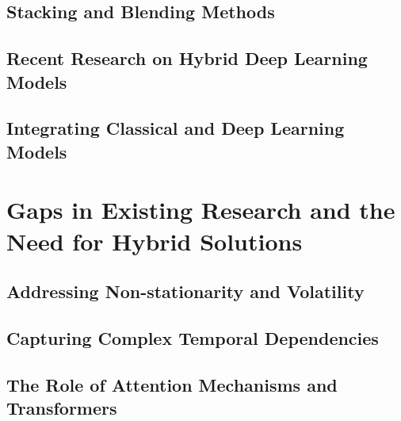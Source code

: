 \subsection{Stacking and Blending Methods} %

\subsection{Recent Research on Hybrid Deep Learning Models} %

\subsection{Integrating Classical and Deep Learning Models} %

\section{Gaps in Existing Research and the Need for Hybrid Solutions} %
\subsection{Addressing Non-stationarity and Volatility} %

\subsection{Capturing Complex Temporal Dependencies} %

\subsection{The Role of Attention Mechanisms and Transformers} %
